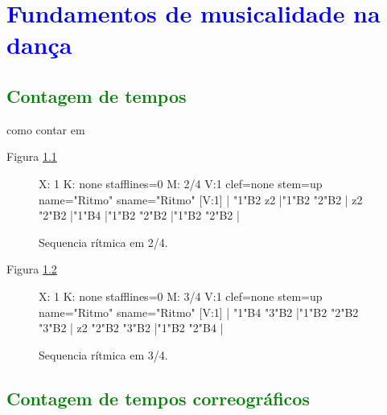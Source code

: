 
\chapter{\textcolor{blue}{Fundamentos de musicalidade na dança}}

\section{\textcolor{green}{Contagem de tempos }}
\label{sec:contagemtempos}
como contar em \cite[pp. 8]{phillips2002sight}

Figura \ref{fig:contartempos24} 

\begin{figure}[h]
    \centering
 \begin{abc}[name=abc-contartempos24]
%
X: 1 %
K: none stafflines=0 %
M:  2/4
V:1 clef=none stem=up name="Ritmo"   sname="Ritmo"
%
[V:1] | "1"B2 z2  |"1"B2 "2"B2  | z2 "2"B2  |"1"B4  |"1"B2 "2"B2  |"1"B2 "2"B2  |
%       
\end{abc}
    \caption{Sequencia rítmica em 2/4.}\label{fig:contartempos24}
\end{figure}


Figura \ref{fig:contartempos34} 

\begin{figure}[h]
    \centering
 \begin{abc}[name=abc-contartempos34]
%
X: 1 %
K: none stafflines=0 %
M:  3/4
V:1 clef=none stem=up name="Ritmo"   sname="Ritmo"
%
[V:1] | "1"B4 "3"B2 |"1"B2 "2"B2 "3"B2  | z2 "2"B2 "3"B2  |"1"B2 "2"B4  |
%       
\end{abc}
    \caption{Sequencia rítmica em 3/4.}\label{fig:contartempos34}
\end{figure}


\section{\textcolor{green}{Contagem de tempos correográficos}}

